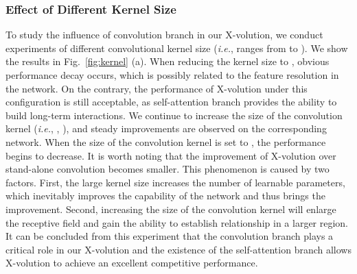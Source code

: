 \documentclass{article}
\begin{document}
\subsubsection{Effect of Different Kernel Size}
To study the influence of convolution branch in our X-volution, we conduct experiments of different convolutional kernel size (\emph{i.e.}, ranges from  to ).
We show the results in Fig.~\ref{fig:kernel} (a).
When reducing the kernel size to , obvious performance decay occurs, which is possibly related to the feature resolution in the network. 
On the contrary, the performance of X-volution under this configuration is still acceptable, as self-attention branch provides the ability to build long-term interactions.
We continue to increase the size of the convolution kernel (\emph{i.e.}, , ), and steady improvements are observed on the corresponding network. 
When the size of the convolution kernel is set to , the performance begins to decrease.
It is worth noting that the improvement of X-volution over stand-alone convolution becomes smaller.
This phenomenon is caused by two factors.
First, the large kernel size increases the number of learnable parameters, which inevitably improves the capability of the network and thus brings the improvement.
Second, increasing the size of the convolution kernel will enlarge the receptive field and gain the ability to establish relationship in a larger region.
It can be concluded from this experiment that the convolution branch plays a critical role in our X-volution and the existence of the self-attention branch allows X-volution to achieve an excellent competitive performance.
\end{document}
